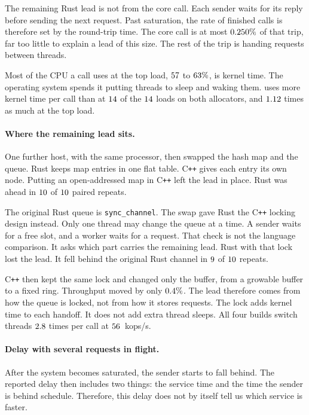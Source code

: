 \documentclass[english,oneside,a4paper,censored,csm,software-track-2020]{HYthesisML}
\begin{document}
The remaining Rust lead is not from the core call. Each sender waits for its
reply before sending the next request. Past saturation, the rate of finished
calls is therefore set by the round-trip time. The core call is at most
$0.250\%$ of that trip, far too little to explain a lead of
this size. The rest of the trip is handing requests between threads.

Most of the CPU a call uses at the top load, $57$ to
$63\%$, is kernel time. The operating system spends it
putting threads to sleep and waking them. \ProbeAfterSysHigher{} uses more
kernel time per call than \ProbeAfterSysLower{} at
$14$ of the $14$ loads on both
allocators, and $1.12$ times as much at the top load.

\paragraph{Where the remaining lead sits.}
One further host, with the same processor, then swapped the hash map and the
queue. Rust keeps map entries in one flat table. C\texttt{++} gives each
entry its own node. Putting an open-addressed map in C\texttt{++} left the
lead in place. Rust was ahead in $10$ of $10$
paired repeats.

The original Rust queue is \texttt{sync\_channel}. The swap gave Rust the
C\texttt{++} locking design instead. Only one thread may change the queue
at a time. A sender waits for a free slot, and a worker waits for a
request. That check is not the language comparison. It asks which part
carries the remaining lead. Rust with that lock lost the lead. It fell
behind the original Rust channel in $9$ of
$10$ repeats.

C\texttt{++} then kept the same lock and changed only the buffer, from a
growable buffer to a fixed ring. Throughput moved by only
$0.4\%$. The lead therefore comes from how the queue is
locked, not from how it stores requests. The lock adds kernel time to each
handoff. It does not add extra thread sleeps. All four builds switch
threads $2.8$ times per call at $56$~kops/s.

\paragraph{Delay with several requests in flight.}
After the system becomes saturated, the sender starts to fall behind. The
reported delay then includes two things: the service time and the time the
sender is behind schedule. Therefore, this delay does not by itself tell us
which service is faster.
\end{document}
